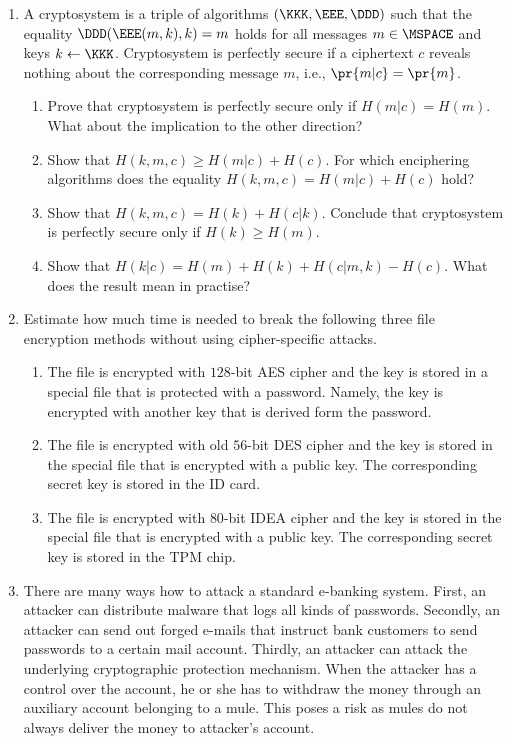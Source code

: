 \documentclass{article}
\begin{document}
\begin{enumerate}
\item A cryptosystem is a triple of algorithms $(\KKK,\EEE,\DDD)$ such
  that the equality $\DDD(\EEE(m,k),k)=m$ holds for all messages
  $m\in\MSPACE$ and keys \mbox{$k\gets\KKK$}. Cryptosystem is
  perfectly secure if a ciphertext $c$ reveals nothing about the
  corresponding message $m$, i.e., $\pr{m|c}=\pr{m}$. 
  \begin{enumerate}
  \item Prove that cryptosystem is perfectly secure only if
    $H(m|c)=H(m)$. What about the implication to the other direction?
  \item Show that $H(k,m,c)\geq H(m|c)+H(c)$. For which enciphering
    algorithms does the equality $H(k,m,c)= H(m|c)+H(c)$ hold?
  \item Show that $H(k,m,c)=H(k)+H(c|k)$. Conclude that cryptosystem
    is perfectly secure only if $H(k)\geq H(m)$. 
  \item Show that $H(k|c)=H(m)+H(k)+H(c|m,k)-H(c)$. What does the
    result mean in practise?
  \end{enumerate}

\item Estimate how much time is needed to break the following three
  file encryption methods without using cipher-specific attacks.
  \begin{enumerate}
  \item The file is encrypted with $128$-bit AES cipher and the
    key is stored in a special file that is protected with a
    password. Namely, the key is encrypted with another key that is
    derived form the password.
  \item The file is encrypted with old $56$-bit DES cipher and
    the key is stored in the special file that is encrypted with a
    public key. The corresponding secret key is stored in the ID card.
  \item The file is encrypted with $80$-bit IDEA cipher and
    the key is stored in the special file that is encrypted with a
    public key. The corresponding secret key is stored in the TPM chip.
  \end{enumerate}

\item There are many ways how to attack a standard e-banking
  system. First, an attacker can distribute malware that logs all
  kinds of passwords. Secondly, an attacker can send out forged
  e-mails that instruct bank customers to send passwords to a certain
  mail account. Thirdly, an attacker can attack the underlying
  cryptographic protection mechanism.  When the attacker has a control
  over the account, he or she has to withdraw the money through an
  auxiliary account belonging to a mule. This poses a risk as mules do
  not always deliver the money to attacker's account.


\end{enumerate}
\end{document}
